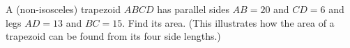 A (non-isosceles) trapezoid $ABCD$ has parallel sides $AB=20$ and $CD=6$ and legs $AD=13$ and $BC=15$. Find its area. (This illustrates how the area of a trapezoid can be found from its four side lengths.)
